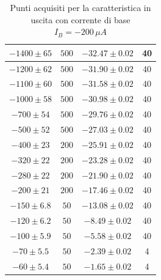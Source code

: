 \documentclass[]{article}
\begin{document}
\begin{table}[H]
\begin{tabular}{|c|c|c|c|}
		\hline
		$ -1400\pm 65 $ &$ 500 $ & $ -32.47\pm 0.02 $ &40 \\
		\hline
		$ -1200\pm 62 $ &$ 500 $ & $ -31.90\pm 0.02 $ &40 \\
		\hline
		$ -1100\pm 60 $ &$ 500 $ & $ -31.58\pm 0.02 $ &40 \\
		\hline
		$ -1000\pm 58 $ &$ 500 $ & $ -30.98\pm 0.02 $ &40 \\
		\hline
		$ -700\pm 54 $ &$ 500 $ & $ -29.76\pm 0.02 $ &40 \\
		\hline
		$ -500\pm 52 $ &$ 500 $ & $ -27.03\pm 0.02 $ &40 \\
		\hline
		$ -400\pm 23 $ &$ 200 $ & $ -25.91\pm 0.02 $ &40 \\
		\hline
		$ -320\pm 22 $ &$ 200 $ & $-23.28\pm 0.02 $ &40 \\
		\hline
		$-280\pm 22 $ &$ 200 $ & $ -21.90\pm 0.02 $ &40 \\
		\hline
		$ -200\pm 21 $ &$ 200 $ & $ -17.46\pm 0.02 $ &40 \\
		\hline
		$ -150\pm 6.8 $ &$ 50 $ & $ -13.08\pm 0.02 $ &40 \\
		\hline
		$ -120\pm 6.2 $ &$ 50 $ & $ -8.49\pm 0.02 $ &40 \\
		\hline
		$ -100\pm 5.9 $ &$ 50 $ & $ -5.58\pm 0.02 $ &40 \\
		\hline
		$ -70\pm 5.5 $ &$ 50 $ & $ -2.39\pm 0.02 $ &4 \\
		\hline
		$ -60\pm 5.4 $ &$ 50 $ & $ -1.65\pm 0.02 $ &4 \\
		\hline
	\end{tabular}
		\caption{Punti acquisiti per la caratteristica in uscita con corrente di base $ I_{B}= -200\, \mu A $}
		\label{tab:200muA}
	\end{table}
\end{document}
